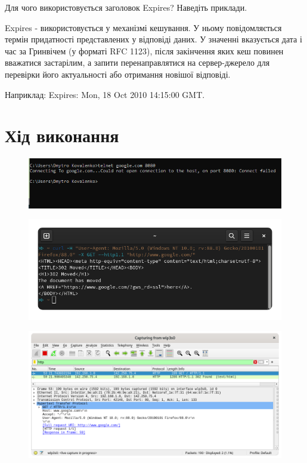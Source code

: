 \documentclass{article}
\begin{document}
\begin{normalsize}
Для чого використовується заголовок Expires? Наведіть приклади.

Expires - використовується у механізмі кешування. У ньому
повідомляється термін придатності представлених у відповіді даних. У
значенні вказується дата і час за Гринвічем (у форматі RFC 1123), після
закінчення яких кеш повинен вважатися застарілим, а запити перенаправлятися
на сервер-джерело для перевірки його актуальності або отримання новішої
відповіді.

Наприклад: Expires: Mon, 18 Oct 2010 14:15:00 GMT.

\section*{Хід виконання}
\begin{figure}[H]
	\centering
	\includegraphics[width=\textwidth]{11}
\end{figure}

\begin{figure}[H]
	\centering
	\includegraphics[width=\textwidth]{21}
\end{figure}
\begin{figure}[H]
	\centering
	\includegraphics[width=\textwidth]{22}
\end{figure}


\end{normalsize}
\end{document}
